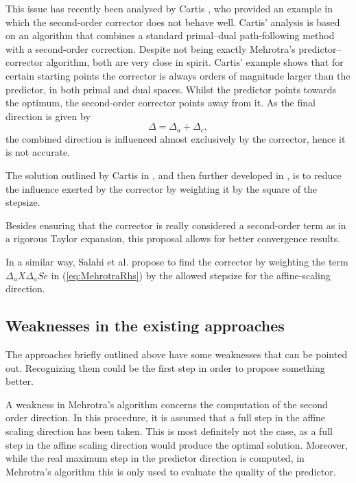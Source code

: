 \hrulefill

This issue has recently been analysed by Cartis \cite{Cartis04}, 
who provided an example in which the second-order corrector does 
not behave well. Cartis' analysis is based on an algorithm 
that combines a standard primal--dual path-following method with 
a second-order correction. Despite not being exactly Mehrotra's 
predictor--corrector algorithm, both are very close in spirit.
Cartis' example shows that for certain starting points the corrector 
is always orders of magnitude larger than the predictor, in both 
primal and dual spaces. Whilst the predictor points towards 
the optimum, the second-order corrector points away from it.
As the final direction is given by
\[
\Delta = \Delta_{a} +\Delta_c,
\]
the combined direction is influenced almost exclusively by the corrector, 
hence it is not accurate. 



The solution outlined by Cartis in \cite{Cartis04}, and then further 
developed in \cite{Cartis05}, is to reduce the influence exerted by 
the corrector by weighting it by the square of the stepsize. 

Besides ensuring that the corrector is really considered 
a second-order term as in a rigorous Taylor expansion, 
this proposal allows for better convergence results.


In a similar way, Salahi et al. \cite{SalahiPengTerlaky} propose to find 
the corrector by weighting the term $\Delta_a X \Delta_a S e$ in 
(\ref{eq:MehrotraRhs}) by the allowed stepsize for the affine-scaling 
direction.

%
%
\subsection{Weaknesses in the existing approaches}

The approaches briefly outlined above have some weaknesses that 
can be pointed out. Recognizing them could be the first step in 
order to propose something better.

A weakness in Mehrotra's algorithm concerns the computation of the 
second order direction. In this procedure, it is assumed that a 
full step in the affine scaling direction has been taken. This is 
most definitely not the case, as a full step in the affine scaling 
direction would produce the optimal solution. Moreover, while
the real maximum step in the predictor direction is computed, 
in Mehrotra's algorithm this is only used to evaluate the quality 
of the predictor.

